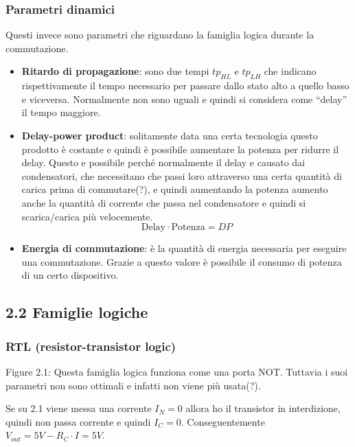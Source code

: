 \documentclass[
]{article}
\providecommand{\tightlist}{%
  \setlength{\itemsep}{0pt}\setlength{\parskip}{0pt}}
\begin{document}
\subsubsection{Parametri dinamici}\label{parametri-dinamici}

Questi invece sono parametri che riguardano la famiglia logica durante
la commutazione.

\begin{itemize}
\tightlist
\item
  \textbf{Ritardo di propagazione}: sono due tempi \(tp_{HL}\) e
  \(tp_{LH}\) che indicano rispettivamente il tempo necessario per
  passare dallo stato alto a quello basso e viceversa. Normalmente non
  sono uguali e quindi si considera come ``delay'' il tempo maggiore.
\item
  \textbf{Delay-power product}: solitamente data una certa tecnologia
  questo prodotto è costante e quindi è possibile aumentare la potenza
  per ridurre il delay. Questo e possibile perché normalmente il delay e
  causato dai condensatori, che necessitano che passi loro attraverso
  una certa quantità di carica prima di commutare(?), e quindi
  aumentando la potenza aumento anche la quantità di corrente che passa
  nel condensatore e quindi si scarica/carica più velocemente.
  \[\text{Delay}\cdot\text{Potenza}=DP\]
\item
  \textbf{Energia di commutazione}: è la quantità di energia necessaria
  per eseguire una commutazione. Grazie a questo valore è possibile il
  consumo di potenza di un certo dispositivo.
\end{itemize}

\subsection{2.2 Famiglie logiche}\label{famiglie-logiche}

\subsubsection{RTL (resistor-transistor
logic)}\label{rtl-resistor-transistor-logic}

Figure 2.1: Questa famiglia logica funziona come una porta NOT. Tuttavia
i suoi parametri non sono ottimali e infatti non viene più usata(?).

Se su 2.1 viene messa una corrente \(I_{N}=0\) allora ho il transistor
in interdizione, quindi non passa corrente e quindi \(I_{C}=0\).
Conseguentemente \(V_{out}=5V-R_{C}\cdot I=5V\).
\end{document}
